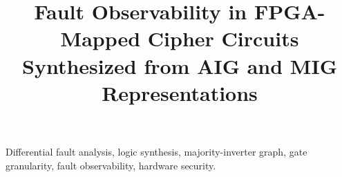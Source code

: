 \documentclass[conference]{IEEEtran}
\title{Fault Observability in FPGA-Mapped Cipher Circuits Synthesized from AIG and MIG Representations}
\author{
\IEEEauthorblockN{Anonymous Submission}
\IEEEauthorblockA{Institution withheld for review}
}
\begin{document}
\maketitle

\begin{abstract}

\end{abstract}

\begin{IEEEkeywords}
Differential fault analysis, logic synthesis, majority-inverter graph,
gate granularity, fault observability, hardware security.
\end{IEEEkeywords}










\end{document}
